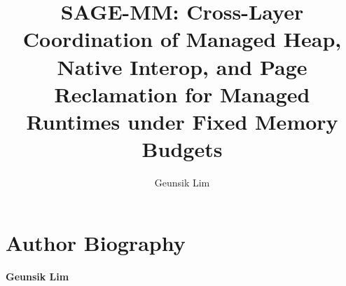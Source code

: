 \documentclass[STIX2COL]{WileyNJD-v2}
\begin{document}
\title{SAGE-MM: Cross-Layer Coordination of Managed Heap, Native Interop, and
Page Reclamation for Managed Runtimes under Fixed Memory Budgets}

\author[1]{Geunsik Lim}

\address[1]{Sungkyunkwan University, Suwon, Republic of Korea}


\abstract[Abstract]{}

\keywords{}

\maketitle






\section*{Author Biography}
\noindent\textbf{Geunsik Lim} 
\end{document}
